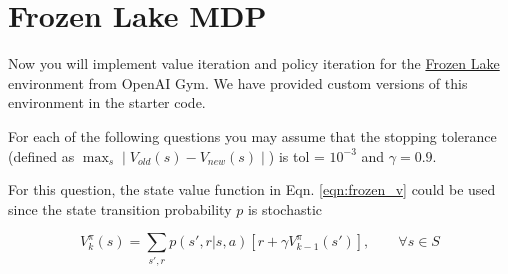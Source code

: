 \section{Frozen Lake MDP}

Now you will implement value iteration and policy iteration for the  \href{https://www.gymlibrary.dev/environments/toy_text/frozen_lake/}{Frozen Lake} environment
from OpenAI Gym. We have provided
custom versions of this environment in the starter code.

For each of the following questions you may assume that the stopping tolerance (defined as $\max_s \mid V_{old}(s) - V_{new}(s) \mid $) is tol = $10^{-3}$ and $\gamma = 0.9$.

For this question, the state value function in Eqn. \ref{eqn:frozen_v} could be used since the state transition probability $p$ is stochastic

\begin{equation}\label{eqn:frozen_v}
    V_{k}^{\pi}(s) = \sum_{s',r} p(s',r|s,a)[r + \gamma V_{k-1}^{\pi}(s')], \qquad \forall s \in S
\end{equation}

\begin{enumerate}[(a)]

	

	

	

	

	

\end{enumerate}
